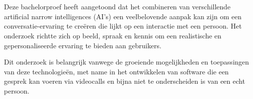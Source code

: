 
%
%

%



\chapter*{}

Deze bachelorproef heeft aangetoond dat het combineren van verschillende artificial narrow intelligences (AI's) een veelbelovende aanpak kan zijn om een conversatie-ervaring te creëren die lijkt op een interactie met een persoon. Het onderzoek richtte zich op beeld, spraak en kennis om een realistische en gepersonaliseerde ervaring te bieden aan gebruikers.

Dit onderzoek is belangrijk vanwege de groeiende mogelijkheden en toepassingen van deze technologieën, met name in het ontwikkelen van software die een gesprek kan voeren via videocalls en bijna niet te onderscheiden is van een echt persoon.

